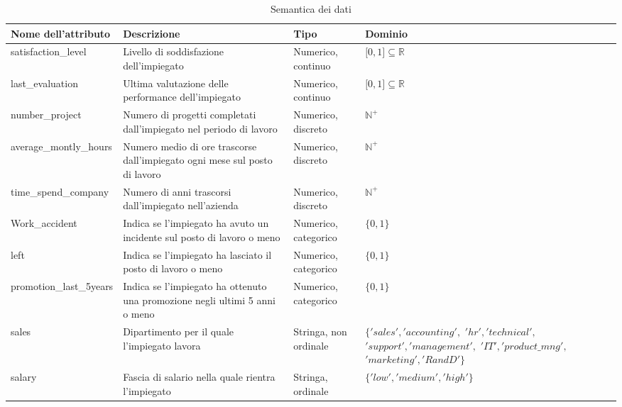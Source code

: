 \documentclass[a4paper]{article}
\begin{document}
\begin{table}[h]
\centering


\begingroup
\setlength{\tabcolsep}{8pt} %
\renewcommand{\arraystretch}{1.4} %
\begin{tabularx}{\textwidth}{|lXlX|}
\hline
\textbf{Nome dell'attributo} & \textbf{Descrizione}                                                              & \textbf{Tipo} & Dominio\\\hline
satisfaction\_level          & Livello di soddisfazione dell'impiegato  & Numerico, continuo  & ${[}0,1{]}\subseteq\mathbb{R}$  \\ 
last\_evaluation             & Ultima valutazione delle performance dell'impiegato                                   & Numerico, continuo  & ${[}0,1{]}\subseteq\mathbb{R}$\\ 
number\_project              & Numero di progetti completati dall'impiegato nel periodo di lavoro                               & Numerico, discreto  & $\mathbb{N^+}$  \\ 
average\_montly\_hours       & Numero medio di ore trascorse dall'impiegato ogni mese sul posto di lavoro                       & Numerico, discreto   & $\mathbb{N^+}$   \\ 
time\_spend\_company         & Numero di anni trascorsi dall'impiegato nell'azienda                                             & Numerico, discreto   & $\mathbb{N^+}$   \\ 
Work\_accident               & Indica se l'impiegato ha avuto un incidente sul posto di lavoro o meno                                         & Numerico, categorico   & $ \{ 0, 1 \}$   \\ 
left                         & Indica se l'impiegato ha lasciato il posto di lavoro o meno                       & Numerico, categorico   & $ \{ 0, 1 \}$   \\ 
promotion\_last\_5years      & Indica se l'impiegato ha ottenuto una promozione negli ultimi 5 anni o meno     & Numerico, categorico   & $ \{ 0, 1 \}$   \\ 
sales                        & Dipartimento per il quale l'impiegato lavora                                      & Stringa, non ordinale   & $ \{'sales','accounting',$\newline
$'hr','technical',$\newline
$'support','management',$\newline
$'IT','product\_mng',$\newline
$'marketing','RandD'\}$    \\ 
salary                       & Fascia di salario nella quale rientra l'impiegato     & Stringa, ordinale    & $ \{ 'low', 'medium', 'high' \}$   \\ \hline
\end{tabularx}
\endgroup
\caption{Semantica dei dati}
\label{tab:semantics}
\end{table}
\end{document}
